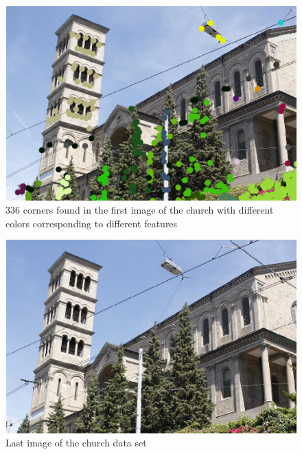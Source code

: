 \begin{figure}[h!]
\centering
\includegraphics[width=1\textwidth]{./Diagrams/first_frame_church_points.png}
\caption{336 corners found in the first image of the church with different colors corresponding to different features}
\label{fig:first_frame_church_points}
\end{figure}

\begin{figure}[h!]
\centering
\includegraphics[width=1 \textwidth]{./Diagrams/last_frame_church.png}
\caption{Last image of the church data set}
\label{fig:last_frame_church}
\end{figure}

